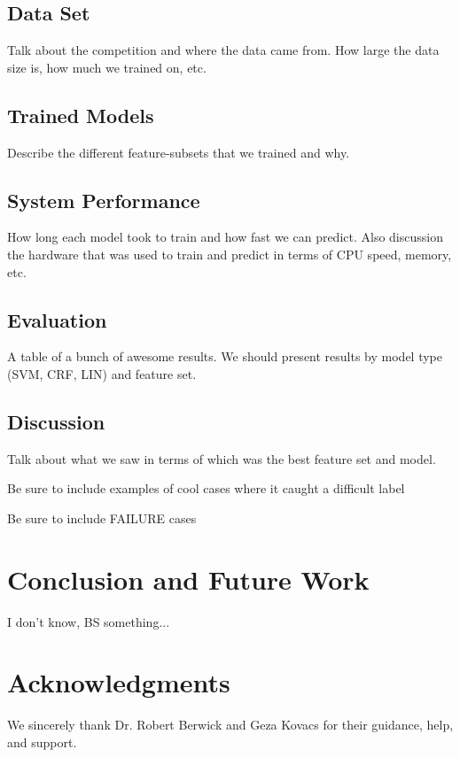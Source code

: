 \documentclass[preprint]{style}
\begin{document}
\subsection{Data Set}

Talk about the competition and where the data came from. How large the data size is, how much we trained on, etc.

\subsection{Trained Models}

Describe the different feature-subsets that we trained and why.


\subsection{System Performance}

How long each model took to train and how fast we can predict. Also discussion the hardware that was used to train and predict in terms of CPU speed, memory, etc.

\subsection{Evaluation}

A table of a bunch of awesome results. We should present results by model type (SVM, CRF, LIN) and feature set.

\subsection{Discussion}

Talk about what we saw in terms of which was the best feature set and model. 

Be sure to include examples of cool cases where it caught a difficult label

Be sure to include FAILURE cases

\section{Conclusion and Future Work}

I don't know, BS something...


\section{Acknowledgments}

We sincerely thank Dr. Robert Berwick  and Geza Kovacs
for their guidance, help, and support.



%


\balancecolumns
\end{document}
